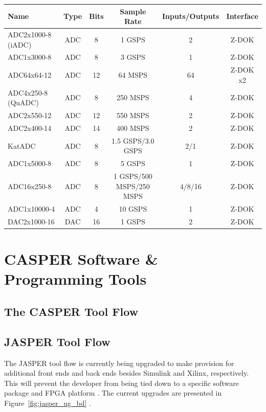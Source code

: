 \documentclass{ws-jai}
\begin{document}
\begin{tabular}{lccccc}
\label{table:adcs_dacs}
Name & Type & Bits & Sample Rate & Inputs/Outputs & Interface \\
\hline
ADC2x1000-8 (iADC) & ADC & 8 & 1 GSPS & 2 & Z-DOK \\
ADC1x3000-8 & ADC & 8 & 3 GSPS & 1 & Z-DOK \\
ADC64x64-12 & ADC & 12 & 64 MSPS & 64 & Z-DOK x2 \\
ADC4x250-8 (QuADC) & ADC & 8 & 250 MSPS & 4 & Z-DOK \\
ADC2x550-12 & ADC & 12 & 550 MSPS & 2 & Z-DOK \\
ADC2x400-14 & ADC & 14 & 400 MSPS & 2 & Z-DOK \\
KatADC & ADC & 8 & 1.5 GSPS/3.0 GSPS & 2/1 & Z-DOK \\
ADC1x5000-8 & ADC & 8 & 5 GSPS & 1 & Z-DOK \\
ADC16x250-8 & ADC & 8 & 1 GSPS/500 MSPS/250 MSPS & 4/8/16 & Z-DOK \\
ADC1x10000-4 & ADC & 4 & 10 GSPS & 1 & Z-DOK \\
DAC2x1000-16 & DAC & 16 & 1 GSPS & 2 & Z-DOK \\
\end{tabular}

\section{CASPER Software \& Programming Tools} \label{sec:Software}

\subsection{The CASPER Tool Flow}


\subsection{JASPER Tool Flow}


The JASPER tool flow is currently being upgraded to make provision for additional front ends and back ends besides Simulink and Xilinx, respectively. This will prevent the developer from being tied down to a specific software package and FPGA platform \cite{Isaac16}. The current upgrades are presented in Figure~\ref{fig:jasper_ug_bd} \cite{Isaac16}.
\end{document}
